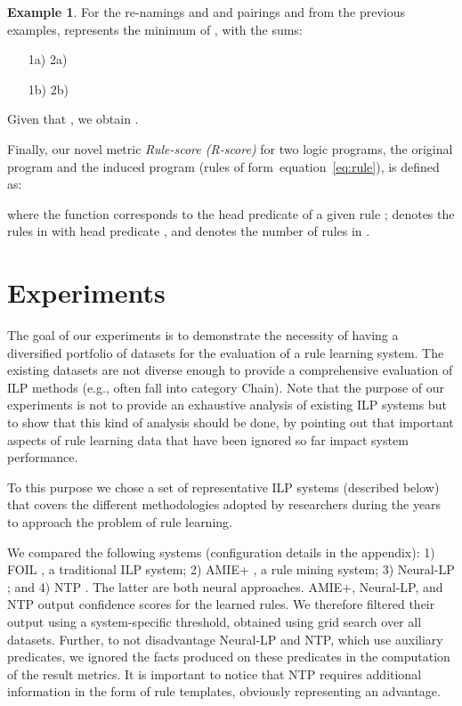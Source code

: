 \documentclass[letterpaper]{article} \usepackage{aaai20}  \usepackage{times}  \usepackage{helvet} \usepackage{courier}  \usepackage[hyphens]{url}  \usepackage{graphicx} \urlstyle{rm} \def\UrlFont{\rm}  \usepackage{graphicx}  \frenchspacing  \setlength{\pdfpagewidth}{8.5in}  \setlength{\pdfpageheight}{11in}  \usepackage{amsthm}
\theoremstyle{definition}
\newtheorem{example}{Example}[section]
\def\eqref#1{equation~\ref{#1}}
\begin{document}
\begin{example}
For the re-namings  and  and pairings  and  from the previous examples,  represents the minimum of , with the sums:
\begin{itemize}
\item[1a)]  \hspace{0.3cm}2a)
\hspace{0.03cm}
\item[1b)]  \hspace{0.54cm}2b)
\hspace{0.03cm}
\end{itemize}
Given that , we obtain .
\end{example}










Finally, our novel metric \emph{Rule-score (R-score)} for two logic programs, the original program  and the induced program  (rules of form~\eqref{eq:rule}), is defined as:

where the function  corresponds to the head predicate of a given rule ; 
 denotes the rules in  with head predicate , and  denotes the number of rules in .



\section{Experiments}\label{sec:experiments}

The goal of our experiments is to demonstrate the necessity of having a diversified portfolio of datasets for the evaluation of a rule learning system. The existing datasets are not diverse enough to provide a comprehensive evaluation of ILP methods (e.g., often fall into category Chain). Note that the purpose of our experiments is not to provide an exhaustive analysis of existing ILP systems but to show that this kind of analysis should be done, by pointing out that important aspects of rule learning data that have been ignored so far impact system performance. 

To this purpose we chose a set of representative ILP systems (described below) that covers the different methodologies adopted by researchers during the years to approach the problem of rule learning.

We compared the following systems
(configuration details in the appendix): 
1) FOIL \cite{Quinlan-ML90:foil}, a traditional ILP system; 2) AMIE+ \cite{Galarraga+-VLDBJ15:amiep}, a rule mining system; 3) Neural-LP \cite{YaYaCo-NIPS17:neurallp}; and 4) NTP \cite{RoR-NIPS17}. The latter are both neural approaches.
AMIE+, Neural-LP, and NTP output confidence scores for the learned rules.
We therefore filtered their output using a system-specific threshold, obtained using grid search over all datasets.
Further, to not disadvantage Neural-LP and NTP, which use auxiliary predicates, we ignored the facts produced on these predicates in the computation of the result metrics. It is important to notice that NTP requires additional information in the form of rule templates, obviously representing an advantage. 
\end{document}
